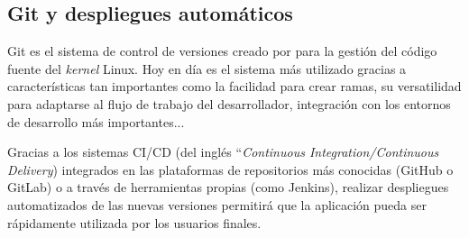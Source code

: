 \documentclass{\ClassPath/viu-tfm-template}
\begin{document}
\subsection{Git y despliegues automáticos}

Git es el sistema de control de versiones creado por \textcite{git} para la gestión del código fuente del \textit{kernel} Linux. Hoy en día es el sistema más utilizado gracias a características tan importantes como la facilidad para crear ramas, su versatilidad para adaptarse al flujo de trabajo del desarrollador, integración con los entornos de desarrollo más importantes...

Gracias a los sistemas CI/CD (del inglés “\textit{Continuous Integration/Continuous Delivery}) integrados en las plataformas de repositorios más conocidas (GitHub o GitLab) o a través de herramientas propias (como Jenkins), realizar despliegues automatizados de las nuevas versiones permitirá que la aplicación pueda ser rápidamente utilizada por los usuarios finales.

%
%


%
%
\end{document}
